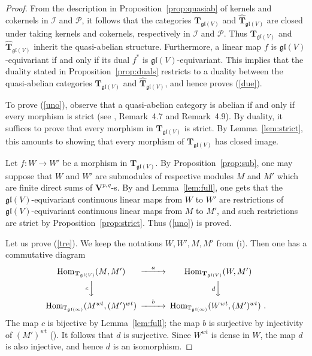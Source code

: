 \documentclass[12pt,reqno]{amsart}
\newcommand{\Hom}{\mathrm{Hom}}
\theoremstyle{definition}
\theoremstyle{remark}
\begin{document}
	\begin{proof}
	From the description in Proposition~\ref{prop:quasiab} of kernels and cokernels in $\mathcal{I}$ and $\mathcal{P}$, it follows that the categories $\mathbf{T}_{\mathfrak{gl}(V)}$ and $\widehat{{\mathbf T}}_{\mathfrak{gl}(V)}$ are closed under taking kernels and cokernels, respectively in $\mathcal{I}$ and $\mathcal{P}$. Thus $\mathbf{T}_{\mathfrak{gl}(V)}$ and $\widehat{{\mathbf T}}_{\mathfrak{gl}(V)}$ inherit the quasi-abelian structure.
	Furthermore, a linear map $f$ is $\mathfrak{gl}(V)$-equivariant if and only if its dual $f^\ast$ is $\mathfrak{gl}(V)$-equivariant. This implies that the duality stated in Proposition~\ref{prop:duals} restricts to a duality between the quasi-abelian categories $\mathbf{T}_{\mathfrak{gl}(V)}$ and $\widehat{{\mathbf T}}_{\mathfrak{gl}(V)}$, and hence proves 
	(\ref{due}).
	
	To prove (\ref{uno}), observe that a quasi-abelian category is abelian if and only if every morphism is strict (see \cite{Buh}, Remark~4.7 and Remark~4.9). By duality, it suffices to prove that every morphism in $\mathbf{T}_{\mathfrak{gl}(V)}$ is strict. By Lemma~\ref{lem:strict}, this amounts to showing that every morphism of $\mathbf{T}_{\mathfrak{gl}(V)}$ has closed image. 
	
	Let $f:W\rightarrow W'$ be a morphism in $\mathbf{T}_{\mathfrak{gl}(V)}$. By Proposition~\ref{prop:sub}, one may suppose that $W$ and $W'$ are submodules of respective modules $M$ and $M'$ which are finite direct sums of $\mathbf{V}^{p,q}$-s. By \cite[Proposition~4.5]{DPS} and Lemma~\ref{lem:full}, one gets that the $\mathfrak{gl}(V)$-equivariant continuous linear maps from $W$ to $W'$ are restrictions of $\mathfrak{gl}(V)$-equivariant continuous linear maps from $M$ to $M'$, and such restrictions are strict by Proposition~\ref{prop:strict}. Thus (\ref{uno}) is proved.
	
	Let us prove (\ref{tre}). We keep the notations $W, W', M, M'$ from (i). Then one has a commutative diagram
	$$
	\begin{CD}
	\Hom_{\mathbf{T}_{\mathfrak{gl}(V)}}(M, M')@>{a}>> \Hom_{\mathbf{T}_{\mathfrak{gl}(V)}}(W, M') \\
	@V{c}VV @V{d}VV \\
	\Hom_{\mathbb{T}_{\mathfrak{gl}(\infty)}}(M^{wt}, (M')^{wt})@>{b}>> \Hom_{\mathbb{T}_{\mathfrak{gl}(\infty)}}(W^{wt}, (M')^{wt}) \ .
	\end{CD} 
	$$
	The map $c$ is bijective by Lemma~\ref{lem:full}; the map $b$ is surjective by injectivity of $(M')^{wt}$ (\cite[Proposition~4.5]{DPS}). It follows that $d$ is surjective.
	Since $W^{wt}$ is dense in $W$, the map $d$ is also injective, and hence $d$ is an isomorphism.
	

\end{proof}
\end{document}
